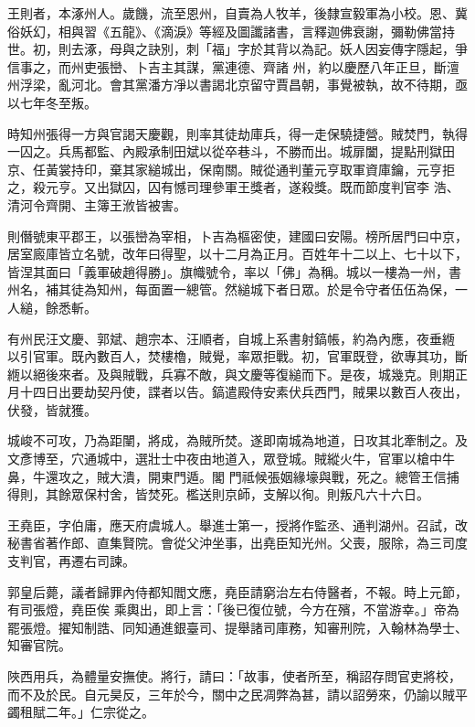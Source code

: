 \begin{pinyinscope}
 王則者，本涿州人。歲饑，流至恩州，自賣為人牧羊，後隸宣毅軍為小校。恩、冀俗妖幻，相與習《五龍》、《滴淚》等經及圖讖諸書，言釋迦佛衰謝，彌勒佛當持世。初，則去涿，母與之訣別，刺「福」字於其背以為記。妖人因妄傳字隱起，爭信事之，而州吏張巒、卜吉主其謀，黨連德、齊諸
 州，約以慶歷八年正旦，斷澶州浮梁，亂河北。會其黨潘方凈以書謁北京留守賈昌朝，事覺被執，故不待期，亟以七年冬至叛。



 時知州張得一方與官謁天慶觀，則率其徒劫庫兵，得一走保驍捷營。賊焚門，執得一囚之。兵馬都監、內殿承制田斌以從卒巷斗，不勝而出。城扉闔，提點刑獄田京、任黃裳持印，棄其家縋城出，保南關。賊從通判董元亨取軍資庫鑰，元亨拒之，殺元亨。又出獄囚，囚有憾司理參軍王獎者，遂殺獎。既而節度判官李
 浩、清河令齊開、主簿王浟皆被害。



 則僭號東平郡王，以張巒為宰相，卜吉為樞密使，建國曰安陽。榜所居門曰中京，居室廄庫皆立名號，改年曰得聖，以十二月為正月。百姓年十二以上、七十以下，皆涅其面曰「義軍破趙得勝」。旗幟號令，率以「佛」為稱。城以一樓為一州，書州名，補其徒為知州，每面置一總管。然縋城下者日眾。於是令守者伍伍為保，一人縋，餘悉斬。



 有州民汪文慶、郭斌、趙宗本、汪順者，自城上系書射鎬帳，約為內應，夜垂緪
 以引官軍。既內數百人，焚樓櫓，賊覺，率眾拒戰。初，官軍既登，欲專其功，斷緪以絕後來者。及與賊戰，兵寡不敵，與文慶等復縋而下。是夜，城幾克。則期正月十四日出要劫契丹使，諜者以告。鎬遣殿侍安素伏兵西門，賊果以數百人夜出，伏發，皆就獲。



 城峻不可攻，乃為距闉，將成，為賊所焚。遂即南城為地道，日攻其北牽制之。及文彥博至，穴通城中，選壯士中夜由地道入，眾登城。賊縱火牛，官軍以槍中牛鼻，牛還攻之，賊大潰，開東門遁。閣
 門祗候張姻緣壕與戰，死之。總管王信捕得則，其餘眾保村舍，皆焚死。檻送則京師，支解以徇。則叛凡六十六日。



 王堯臣，字伯庸，應天府虞城人。舉進士第一，授將作監丞、通判湖州。召試，改秘書省著作郎、直集賢院。會從父沖坐事，出堯臣知光州。父喪，服除，為三司度支判官，再遷右司諫。



 郭皇后薨，議者歸罪內侍都知閻文應，堯臣請窮治左右侍醫者，不報。時上元節，有司張燈，堯臣俟
 乘輿出，即上言：「後已復位號，今方在殯，不當游幸。」帝為罷張燈。擢知制誥、同知通進銀臺司、提舉諸司庫務，知審刑院，入翰林為學士、知審官院。



 陜西用兵，為體量安撫使。將行，請曰：「故事，使者所至，稱詔存問官吏將校，而不及於民。自元昊反，三年於今，關中之民凋弊為甚，請以詔勞來，仍諭以賊平蠲租賦二年。」仁宗從之。




\end{pinyinscope}
